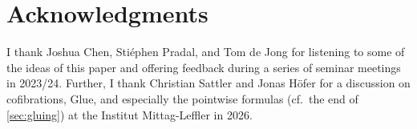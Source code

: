 \section*{Acknowledgments}
I thank Joshua Chen, Sti\'ephen Pradal, and Tom de Jong for listening to some of the ideas of this paper and offering feedback during a series of seminar meetings in 2023/24.
Further, I thank Christian Sattler and Jonas H\"ofer for a discussion on cofibrations, Glue, and especially the pointwise formulas (cf.\ the end of \cref{sec:gluing}) at the Institut Mittag-Leffler in 2026.
